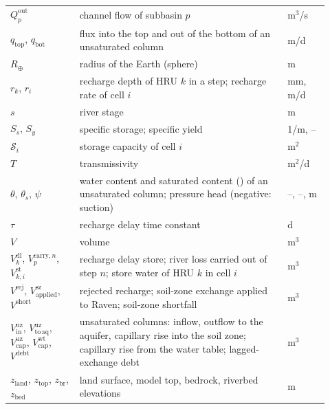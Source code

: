 \begin{longtable}{P{0.2\linewidth}P{0.6\linewidth}P{0.12\linewidth}}
$Q^{\mathrm{out}}_p$ & channel flow of subbasin $p$ & m$^3$/s\\
$q_{\mathrm{top}}$, $q_{\mathrm{bot}}$ & flux into the top and out of the bottom of an unsaturated column & m/d\\
$R_\oplus$ & radius of the Earth (sphere) & m\\
$r_k$, $r_i$ & recharge depth of HRU $k$ in a step; recharge rate of cell $i$ & mm, m/d\\
$s$ & river stage & m\\
$S_s$, $S_y$ & specific storage; specific yield & 1/m, --\\
$\mathcal{S}_i$ & storage capacity of cell $i$ & m$^2$\\
$T$ & transmissivity & m$^2$/d\\
$\theta$, $\theta_s$, $\psi$ & water content and saturated content () of an unsaturated column; pressure head (negative: suction) & --, --, m\\
$\tau$ & recharge delay time constant & d\\
$V$ & volume & m$^3$\\
$V^{\mathrm{dl}}_k$, $V^{\mathrm{carry},n}_p$, $V^{\mathrm{st}}_{k,i}$ & recharge delay store; river loss carried out of step $n$; store water of HRU $k$ in cell $i$ & m$^3$\\
$V^{\mathrm{rej}}$, $V^{\mathrm{sz}}_{\mathrm{applied}}$, $V^{\mathrm{short}}$ & rejected recharge; soil-zone exchange applied to Raven; soil-zone shortfall & m$^3$\\
$V^{\mathrm{uz}}_{\mathrm{in}}$, $V^{\mathrm{uz}}_{\mathrm{to\,aq}}$, $V^{\mathrm{uz}}_{\mathrm{cap}}$, $V^{\mathrm{wt}}_{\mathrm{cap}}$, $V^{\mathrm{debt}}$ & unsaturated columns: inflow, outflow to the aquifer, capillary rise into the soil zone; capillary rise from the water table; lagged-exchange debt & m$^3$\\
$z_{\mathrm{land}}$, $z_{\mathrm{top}}$, $z_{\mathrm{br}}$, $z_{\mathrm{bed}}$ & land surface, model top, bedrock, riverbed elevations & m\\\bottomrule
\end{longtable}

